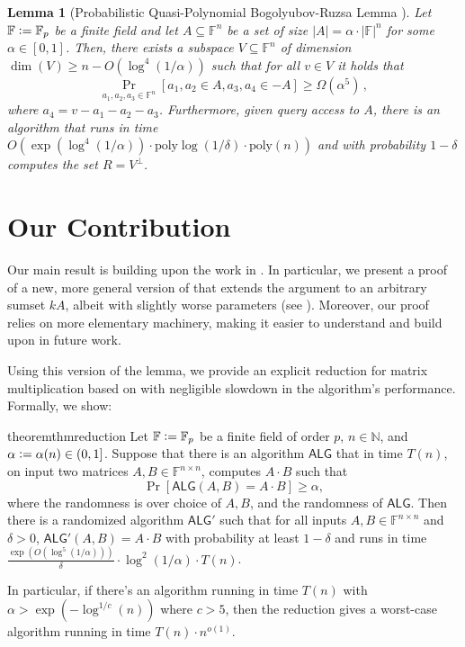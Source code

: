\documentclass[12pt]{caltech_thesis}
\newcommand{\defeq}{\vcentcolon=}
\def\F{\mathbb{F}}
\newtheorem{lemma}{Lemma}
\begin{document}
\begin{lemma}[Probabilistic Quasi-Polynomial Bogolyubov-Ruzsa Lemma \cite{asadi2022worstcase}]
    \label{lem:qpbrasadi}
    Let $\F \defeq \F_p$ be a finite field and let $A \subseteq \F^n$ be a set of size $|A| = \alpha\cdot|\F|^n$ for some $\alpha \in [0,1]$.
    Then, there exists a subspace $V \subseteq \mathbb{F}^n$ of dimension $\dim(V) \geq n - O(\log^4(1/\alpha))$ such that for all $v \in V$ it holds that
    \begin{equation}
    \label{eq:qpbrassadi}
        \Pr_{a_1, a_2, a_3\in \mathbb{F}^n}[a_1, a_2 \in A, a_{3}, a_4 \in -A] \geq \Omega(\alpha^{5})\, ,
    \end{equation}
    where $a_4 = v - a_1 - a_2-a_3$. Furthermore, given query access to $A$, there is an algorithm that runs in time $O(\exp(\log^4(1/\alpha))\cdot\text{poly}\log(1/\delta)\cdot\text{poly}(n))$ and with probability $1-\delta$ computes the set $R = V^\perp$.
\end{lemma}

\section{Our Contribution}

Our main result is building upon the work in \cite{asadi2022worstcase}. In particular, we present a proof of a new, more general version of  that extends the argument to an arbitrary sumset $kA$, albeit with slightly worse parameters (see ). Moreover, our proof relies on more elementary machinery, making it easier to understand and build upon in future work.

Using this version of the lemma, we provide an explicit reduction for matrix multiplication based on  with negligible slowdown in the algorithm's performance. Formally, we show:
\begin{restatable}{theorem}{thmreduction}
\label{thm:reduction}
    Let $\F \defeq \F_p$ be a finite field of order $p$, $n \in \mathbb{N}$, and $\alpha \defeq \alpha(n) \in (0, 1]$.
    Suppose that there is an algorithm $\mathsf{ALG}$ that in time $T(n)$, on input two matrices $A, B \in \F^{n\times n}$, computes $A\cdot B$ such that
    \begin{equation*}
        \Pr[\mathsf{ALG}(A, B) = A\cdot B] \geq \alpha,
    \end{equation*}
    where the randomness is over choice of $A, B$, and the randomness of $\mathsf{ALG}$.
    Then there is a randomized algorithm $\mathsf{ALG}'$ such that for all inputs $A, B \in \F^{n \times n}$ and $\delta > 0$, $\mathsf{ALG}'(A, B) = A \cdot B$ with probability at least $1 - \delta$ and runs in time $\frac{\exp(O(\log^5 (1/\alpha)))}{\delta}\cdot\log^2(1/\alpha)\cdot T(n)$.
\end{restatable}
\noindent In particular, if there's an algorithm running in time $T(n)$ with $\alpha > \exp(-\log^{1/c}(n))$ where $c > 5$, then the reduction gives a worst-case algorithm running in time $T(n)\cdot n^{o(1)}$.
\end{document}
